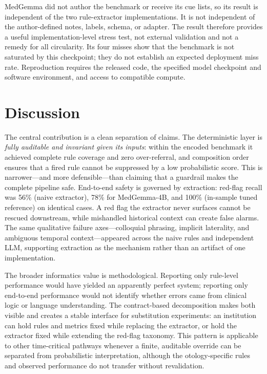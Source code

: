 \documentclass[11pt]{article}
\begin{document}
MedGemma did not author the benchmark or receive its cue lists, so its result is independent of the two rule-extractor implementations. It is not independent of the author-defined notes, labels, schema, or adapter. The result therefore provides a useful implementation-level stress test, not external validation and not a remedy for all circularity. Its four misses show that the benchmark is not saturated by this checkpoint; they do not establish an expected deployment miss rate. Reproduction requires the released code, the specified model checkpoint and software environment, and access to compatible compute.

\section{Discussion}
The central contribution is a clean separation of claims. The deterministic layer is \emph{fully auditable and invariant given its inputs}: within the encoded benchmark it achieved complete rule coverage and zero over-referral, and composition order ensures that a fired rule cannot be suppressed by a low probabilistic score. This is narrower---and more defensible---than claiming that a guardrail makes the complete pipeline safe. End-to-end safety is governed by extraction: red-flag recall was 56\% (naive extractor), 78\% for MedGemma-4B, and 100\% (in-sample tuned reference) on identical cases. A red flag the extractor never surfaces cannot be rescued downstream, while mishandled historical context can create false alarms. The same qualitative failure axes---colloquial phrasing, implicit laterality, and ambiguous temporal context---appeared across the naive rules and independent LLM, supporting extraction as the mechanism rather than an artifact of one implementation.

The broader informatics value is methodological. Reporting only rule-level performance would have yielded an apparently perfect system; reporting only end-to-end performance would not identify whether errors came from clinical logic or language understanding. The contract-based decomposition makes both visible and creates a stable interface for substitution experiments: an institution can hold rules and metrics fixed while replacing the extractor, or hold the extractor fixed while extending the red-flag taxonomy. This pattern is applicable to other time-critical pathways whenever a finite, auditable override can be separated from probabilistic interpretation, although the otology-specific rules and observed performance do not transfer without revalidation.
\end{document}
